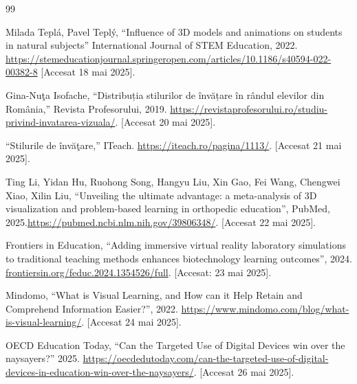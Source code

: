 \documentclass{thesis.cs.pub.ro}
\begin{document}
\begin{thebibliography}{99}

\label{bib:1}
Milada Teplá, Pavel Teplý, “Influence of 3D models and animations on students in natural subjects”
  International Journal of STEM Education, 2022.
  \href{https://stemeducationjournal.springeropen.com/articles/10.1186/s40594-022-00382-8}
    {https://stemeducationjournal.springeropen.com/articles/10.1186/s40594-022-00382-8}
 [Accesat 18 mai 2025].

\label{bib:2}
Gina-Nuţa Isofache, “Distribuția stilurilor de învățare în rândul elevilor din România,”
 Revista Profesorului, 2019. \href{https://revistaprofesorului.ro/studiu-privind-invatarea-vizuala/}
 {https://revistaprofesorului.ro/studiu-privind-invatarea-vizuala/}. [Accesat 20 mai 2025].

\label{bib:3}
“Stilurile de învăţare,” ITeach.
 \href{https://iteach.ro/pagina/1113/}{https://iteach.ro/pagina/1113/}. [Accesat 21 mai 2025].

\label{bib:4}
Ting Li, Yidan Hu, Ruohong Song, Hangyu Liu, Xin Gao, Fei Wang, Chengwei Xiao, Xilin Liu, 
“Unveiling the ultimate advantage: a meta-analysis of 3D visualization and problem-based learning in orthopedic education”, PubMed,
2025.\href{https://pubmed.ncbi.nlm.nih.gov/39806348/}{https://pubmed.ncbi.nlm.nih.gov/39806348/}. [Accesat 22 mai 2025].

\label{bib:5}
Frontiers in Education,
“Adding immersive virtual reality laboratory simulations to traditional teaching methods enhances biotechnology learning outcomes”, 2024.
\href{https://www.frontiersin.org/journals/education/articles/10.3389/feduc.2024.1354526/full}{frontiersin.org/feduc.2024.1354526/full}.
[Accesat: 23 mai 2025].

\label{bib:6}
Mindomo, “What is Visual Learning, and How can it Help Retain and Comprehend Information Easier?”, 2022.
\href{https://www.mindomo.com/blog/what-is-visual-learning/}{https://www.mindomo.com/blog/what-is-visual-learning/}. [Accesat 24 mai 2025].

\label{bib:7}
OECD Education Today, “Can the Targeted Use of Digital Devices win over the naysayers?” 2025. 
\href{https://oecdedutoday.com/can-the-targeted-use-of-digital-devices-in-education-win-over-the-naysayers/}
{https://oecdedutoday.com/can-the-targeted-use-of-digital-devices-in-education-win-over-the-naysayers/}. [Accesat 26 mai 2025].


\end{thebibliography}
\end{document}
